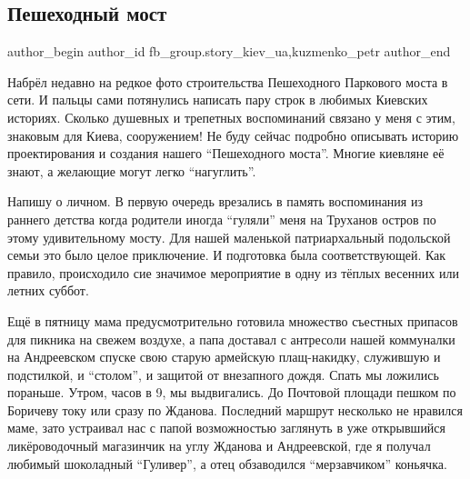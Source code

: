 
 
 
 
 
 
\subsection{Пешеходный мост}
\label{sec:19_06_2021.fb.fb_group.story_kiev_ua.1.most_truhanov}
 
\ifcmt
 author_begin
   author_id fb_group.story_kiev_ua,kuzmenko_petr
 author_end
\fi

Набрёл недавно на редкое фото строительства Пешеходного Паркового моста в сети.
И пальцы сами потянулись написать пару строк в любимых Киевских историях.
Сколько душевных и трепетных воспоминаний связано у меня с этим, знаковым для
Киева, сооружением! Не буду сейчас подробно описывать историю проектирования и
создания нашего \enquote{Пешеходного моста}. Многие киевляне её знают, а желающие могут
легко \enquote{нагуглить}. 

Напишу о личном. В первую очередь врезались в память воспоминания из раннего
детства когда родители иногда \enquote{гуляли} меня на Труханов остров по этому
удивительному мосту. Для нашей маленькой патриархальный подольской семьи это
было целое приключение. И подготовка была соответствующей.  Как правило,
происходило сие значимое мероприятие в одну из тёплых весенних или летних
суббот. 

\zzrule


\zzrule

Ещё в пятницу мама предусмотрительно готовила множество съестных
припасов для пикника на свежем воздухе, а папа доставал с антресоли нашей
коммуналки на Андреевском спуске свою старую армейскую плащ-накидку, служившую
и подстилкой, и \enquote{столом}, и защитой от внезапного дождя. Спать мы ложились
пораньше. Утром, часов в 9, мы выдвигались. До Почтовой площади пешком по
Боричеву току или сразу по Жданова. Последний маршрут несколько не нравился
маме, зато устраивал нас с папой возможностью заглянуть в уже открывшийся
ликёроводочный магазинчик на углу Жданова и Андреевской, где я получал любимый
шоколадный \enquote{Гуливер}, а отец обзаводился \enquote{мерзавчиком} коньячка. 

